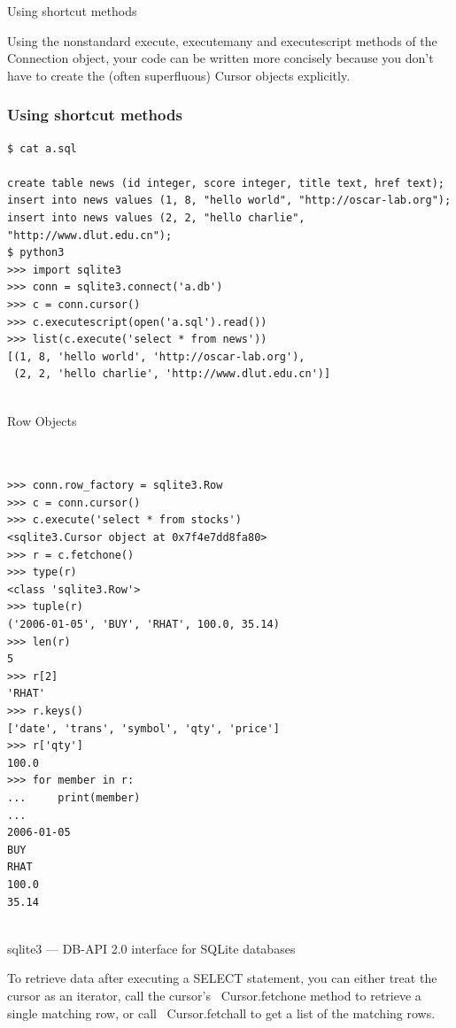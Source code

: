 \documentclass{beamer}
\begin{document}
\begin{frame}[t]{Using shortcut methods}

Using the nonstandard execute, executemany and
executescript methods of the Connection object, your code can
be written more concisely because you don't have to create the (often
superfluous) Cursor objects explicitly. 
\end{frame}

\begin{frame}[t,fragile]
  \frametitle{Using shortcut methods}
	\scriptsize
\begin{verbatim}
$ cat a.sql

create table news (id integer, score integer, title text, href text);
insert into news values (1, 8, "hello world", "http://oscar-lab.org");
insert into news values (2, 2, "hello charlie", "http://www.dlut.edu.cn");
$ python3
>>> import sqlite3
>>> conn = sqlite3.connect('a.db')
>>> c = conn.cursor()
>>> c.executescript(open('a.sql').read())
>>> list(c.execute('select * from news'))
[(1, 8, 'hello world', 'http://oscar-lab.org'),
 (2, 2, 'hello charlie', 'http://www.dlut.edu.cn')]


\end{verbatim}
	
\end{frame}

\begin{frame}[t,fragile]{Row Objects}


\begin{verbatim}


>>> conn.row_factory = sqlite3.Row
>>> c = conn.cursor()
>>> c.execute('select * from stocks')
<sqlite3.Cursor object at 0x7f4e7dd8fa80>
>>> r = c.fetchone()
>>> type(r)
<class 'sqlite3.Row'>
>>> tuple(r)
('2006-01-05', 'BUY', 'RHAT', 100.0, 35.14)
>>> len(r)
5
>>> r[2]
'RHAT'
>>> r.keys()
['date', 'trans', 'symbol', 'qty', 'price']
>>> r['qty']
100.0
>>> for member in r:
...     print(member)
...
2006-01-05
BUY
RHAT
100.0
35.14


\end{verbatim}
\end{frame}



\begin{frame}[t]{sqlite3 --- DB-API 2.0 interface for SQLite databases}

To retrieve data after executing a SELECT statement, you can either treat the
cursor as an iterator, call the cursor's ~Cursor.fetchone method to
retrieve a single matching row, or call ~Cursor.fetchall to get a list of the
matching rows.

\end{frame}
\end{document}
